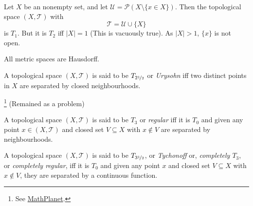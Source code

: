 \begin{example}
	\label{eg: T_2 but not T_1}
	Let $X$ be an nonempty set, and let $\mathcal U = \mathcal P(X \setminus \{x \in X\})$. Then the topological space $(X, \mathcal T)$ with
		$$
		\mathcal T = \mathcal U \cup \{X\}
		$$
		is $T_1$. But it is $T_2$ iff $|X| = 1$ (This is vacuously true). As $|X| > 1$, $\{x\}$ is not open.
\end{example}

\begin{proposition}
	All metric spaces are Hausdorff.
\end{proposition}


\begin{definition}
	\label{def: T_2.5 spaces}
	A topological space $(X, \mathcal T)$ is said to be $T_{2 \nicefrac{1}{2}}$ or \textit{Urysohn} iff two distinct points in $X$ are separated by closed neighbourhoods.
\end{definition}


\begin{example}
	\footnote{
		See \href{https://planetmath.org/hausdorffspacenotcompletelyhausdorff}{MathPlanet}.
	}
	(Remained as a problem)
\end{example}


\begin{definition}
	[$T_3$ spaces]
	\label{def: T_3 spaces}
	A topological space $(X, \mathcal T)$ is said to be $T_3$ or \textit{regular} iff it is $T_0$ and given any point $x \in (X, \mathcal T)$ and closed set $V \subseteq X$ with $x \notin V$ are separated by neighbourhoods.
\end{definition}


\begin{definition}
	\label{def: T_3.5 spaces}
	A topological space $(X, \mathcal T)$ is said to be $T_{3 \nicefrac{1}{2}}$, or \textit{Tychonoff} or, \textit{completely $T_3$}, or \textit{completely regular}, iff it is $T_0$ and given any point $x$ and closed set $V \subseteq X$ with $x \notin V$, they are separated by a continuous function.
\end{definition}


